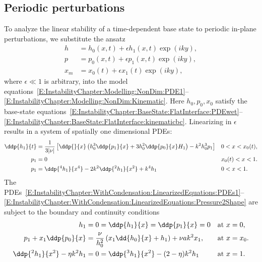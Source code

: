 \subsection{Periodic perturbations}
To analyze the linear stability of a time-dependent base state to periodic in-plane perturbations, we substitute the ansatz
\begin{align}
h &= h_0(x,t) + \epsilon h_1(x,t)\exp(iky), \\
 p &= p_0(x,t) +\epsilon p_1(x,t) \exp(iky), \\
  x_m &= x_0(t) +\epsilon x_1(t)\exp(iky),
\end{align}
where $\epsilon \ll 1$ is arbitrary, into the model equations~\eqref{E:InstabilityChapter:Modelling:NonDim:PDE1}--\eqref{E:InstabilityChapter:Modelling:NonDim:Kinematic}. Here $h_0, p_0, x_0$ satisfy the base-state equations~\eqref{E:InstabilityChapter:BaseState:FlatInterface:PDEwet}--\eqref{E:InstabilityChapter:BaseState:FlatInterface:kinematicbc}. Linearizing in $\epsilon$ results in a system of spatially one dimensional PDEs:
\begin{align}
\ddp{h_1}{t} &= \frac{1}{3|\nu|} \left[\ddp{}{x}\left(h_0^3 \ddp{p_1}{x} + 3h_0^2 \ddp{p_0}{x}H_1\right)- k^2 h_0^3 p_1\right] & &0 < x < x_0(t), \label{E:InstabilityChapter:WithCondensation:LinearizedEquations:PDEs1}\\
p_1&=0 & & x_0(t) < x < 1.\label{E:InstabilityChapter:WithCondensation:LinearizedEquations:PDEs2}\\
p_1 &= \ddp{^4 h_1}{x^4} - 2k^2 \ddp{^2 h_1}{x^2} + k^4 h_1 & & 0 < x < 1.\label{E:InstabilityChapter:WithCondensation:LinearizedEquations:Pressure2Shape}
\end{align}
The PDEs~\eqref{E:InstabilityChapter:WithCondensation:LinearizedEquations:PDEs1}--\eqref{E:InstabilityChapter:WithCondensation:LinearizedEquations:Pressure2Shape} are subject to the boundary and continuity conditions
\begin{align}
h_1 &= 0 = \ddp{h_1}{x} = \ddp{p_1}{x} = 0 & &\text{at}~x = 0,\label{E:InstabilityChapter:WithCondensation:LinearizedEquations:bc_x=0}\\
p_1 + x_1 \ddp{p_0}{x} &=\frac{\nu}{\h_0^2}\left(x_1\dd{h_0}{x} + h_1\right) + \nu \aspect  k^2 x_1, & &\text{at}~x = x_0.\label{E:InstabilityChapter:WithCondensation:LinearizedEquations:PressureBC}\\
\ddp{^2 h_1}{x^2} - \eta k^2 h_1 &= 0 = \ddp{^3 h_1}{x^2} - (2-\eta) k^2 h_1 & & \text{at}~x = 1.\label{E:InstabilityChapter:WithCondensation:LinearizedEquations:bc_x=1}
\end{align}
